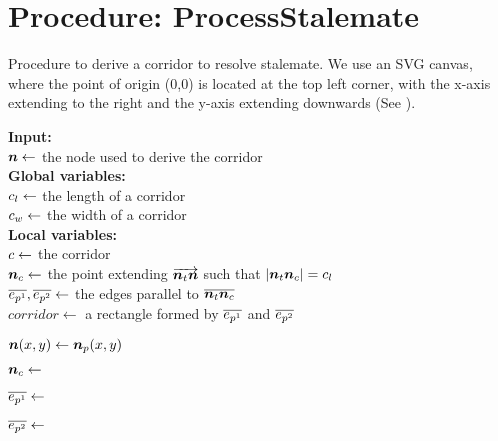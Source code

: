 \section{Procedure: ProcessStalemate}


    \begin{algorithm}[H]
        \caption{Procedure to derive a corridor to resolve stalemate. We use an SVG canvas, where the point of origin (0,0) is located at the top left corner, with the x-axis extending to the right and the y-axis extending downwards (See ).}\label{alg:derive corridor}
    
        \textbf{Input:} \\
        $ \bm{n} \gets $ the node used to derive the corridor \\
    
        \textbf{Global variables:} \\
        $ c_l \gets $ the length of a corridor \\
        $ c_w \gets $ the width of a corridor \\
    
        \textbf{Local variables:} \\
        $ c \gets $ the corridor \\
        $ \bm{n}_c \gets $ the point extending $ \protect\overrightarrow{\bm{n}_t\bm{n}} $ such that $ \lvert \bm{n}_t\bm{n}_c \rvert = c_l $\\
        $ \protect\overline{e_{p^1}}, \protect\overline{e_{p^2}} \gets $ the edges parallel to $ \protect\overline{\bm{n}_t\bm{n}_c} $ \\
        $ corridor \gets $ a rectangle formed by $ \protect\overline{e_{p^1}} $ and $ \protect\overline{e_{p^2}} $ \\
    
        \begin{algorithmic}[1]
                \State $ \bm{n}(x,y) \gets \bm{n}_{p}(x,y) $
    
                \State $ \bm{n}_c \gets $ 
    
                \State $ \protect\overline{e_{p^1}} \gets $ 
    
                \State $ \protect\overline{e_{p^2}} \gets $ 
    

\end{algorithmic}
\end{algorithm}
